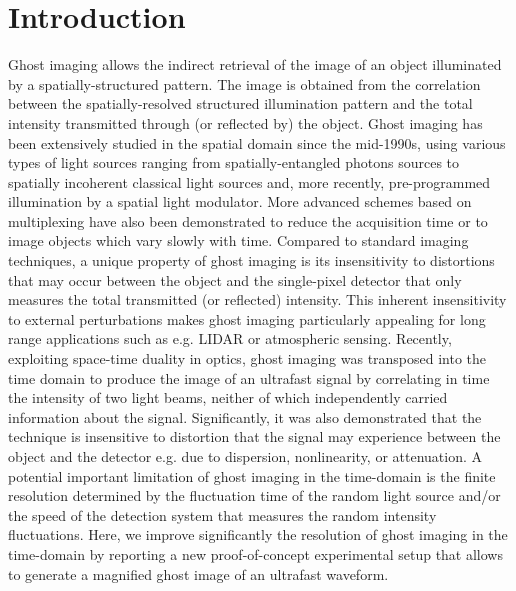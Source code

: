 \documentclass[aip,graphicx]{revtex4-1}
\begin{document}
\pacs{}%

\maketitle %

\section{Introduction}
Ghost imaging allows the indirect retrieval of the image of an object illuminated by a spatially-structured pattern. The image is obtained from the correlation between the spatially-resolved structured illumination pattern and the total intensity transmitted through (or reflected by) the object\cite{Erkmen10,Bennink04}. Ghost imaging has been extensively studied in the spatial domain since the mid-1990s, using various types of light sources ranging from spatially-entangled photons sources\cite{Bennink04,Klyshko88_1,Klyshko88_2,Pittman95,Abouraddy01} to spatially incoherent classical light sources\cite{Bennink04,Bennink02,Scarcelli06,Meyers08,Shirai11,Zhang14} and, more recently, pre-programmed illumination by a spatial light modulator\cite{Sun13}. More advanced schemes based on multiplexing have also been demonstrated to reduce the acquisition time\cite{Zhang2015} or to image objects which vary slowly with time\cite{Devaux2016}. Compared to standard imaging techniques, a unique property of ghost imaging is its insensitivity to distortions that may occur between the object and the single-pixel detector that only measures the total transmitted (or reflected) intensity\cite{Ferri05,Meyers11}. This inherent insensitivity to external perturbations makes ghost imaging particularly appealing for long range applications such as e.g. LIDAR or atmospheric sensing.
%
Recently, exploiting space-time duality in optics\cite{Tournois64,Kolner89,Kolner94,Salem13}, ghost imaging was transposed into the time domain to produce the image of an ultrafast signal by correlating in time the intensity of two light beams, neither of which independently carried information about the signal\cite{Ryczkowski16}. Significantly, it was also demonstrated that the technique is insensitive to distortion that the signal may experience between the object and the detector e.g. due to dispersion, nonlinearity, or attenuation. A potential important limitation of ghost imaging in the time-domain is the finite resolution determined by the fluctuation time of the random light source and/or the speed of the detection system that measures the random intensity fluctuations. Here, we improve significantly the resolution of ghost imaging in the time-domain by reporting a new proof-of-concept experimental setup that allows to generate a magnified ghost image of an ultrafast waveform.
\end{document}
